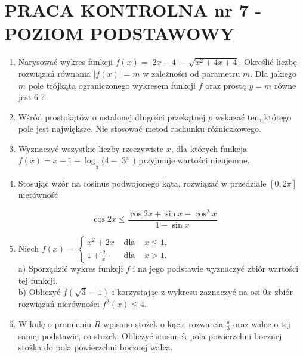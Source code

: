 \documentclass[10pt]{article}
\begin{document}
\section*{PRACA KONTROLNA nr 7 - POZIOM PODSTAWOWY}
\begin{enumerate}
  \item Narysować wykres funkcji $f(x)=|2 x-4|-\sqrt{x^{2}+4 x+4}$. Określić liczbę rozwiązań równania $|f(x)|=m$ w zależności od parametru $m$. Dla jakiego $m$ pole trójkąta ograniczonego wykresem funkcji $f$ oraz prostą $y=m$ równe jest 6 ?
  \item Wśród prostokątów o ustalonej długości przekątnej $p$ wskazać ten, którego pole jest największe. Nie stosować metod rachunku różniczkowego.
  \item Wyznaczyć wszystkie liczby rzeczywiste $x$, dla których funkcja $f(x)=x-1-\log _{\frac{1}{3}}(4-$ $3^{x}$ ) przyjmuje wartości nieujemne.
  \item Stosując wzór na cosinus podwojonego kąta, rozwiązać w przedziale $[0,2 \pi]$ nierówność
\end{enumerate}

$$
\cos 2 x \leqslant \frac{\cos 2 x+\sin x-\cos ^{2} x}{1-\sin x}
$$

\begin{enumerate}
  \setcounter{enumi}{4}
  \item Niech $f(x)=\left\{\begin{array}{lll}x^{2}+2 x & \text { dla } & x \leqslant 1, \\ 1+\frac{2}{x} & \text { dla } & x>1 .\end{array}\right.$\\
a) Sporządzić wykres funkcji $f$ i na jego podstawie wyznaczyć zbiór wartości tej funkcji.\\
b) Obliczyć $f(\sqrt{3}-1)$ i korzystając z wykresu zaznaczyć na osi $0 x$ zbiór rozwiązań nierówności $f^{2}(x) \leqslant 4$.
  \item W kulę o promieniu $R$ wpisano stożek o kącie rozwarcia $\frac{\pi}{3}$ oraz walec o tej samej podstawie, co stożek. Obliczyć stosunek pola powierzchni bocznej stożka do pola powierzchni bocznej walca.
\end{enumerate}
\end{document}
